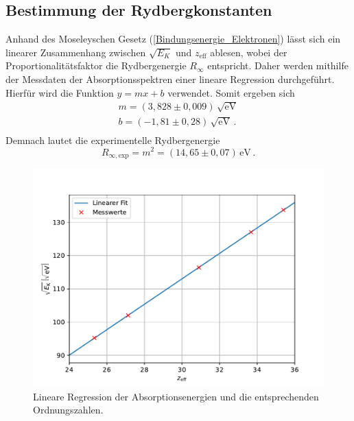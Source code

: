 \subsection{Bestimmung der Rydbergkonstanten}
Anhand des Moseleyschen Gesetz (\ref{Bindungsenergie_Elektronen}) lässt sich ein linearer Zusammenhang zwischen
$\sqrt{E_K}$ und $z_{\text{eff}}$ ablesen, wobei der Proportionalitätsfaktor die Rydbergenergie
$R_{\infty}$ entspricht. Daher werden mithilfe der Messdaten der Absorptionsspektren einer 
lineare Regression durchgeführt. Hierfür wird die Funktion
$y =mx+b$ verwendet. Somit ergeben sich 
\begin{align*}
  m=(3,828\pm0,009)\,\sqrt{\unit{\eV}}\\
  b=(-1,81\pm0,28)\,\sqrt{\unit{\eV}}\,.\\
\end{align*}
Demnach lautet die experimentelle Rydbergenergie 
$$R_{\infty,\text{exp}} = m^2=(14,65\pm0,07)\,\unit{\eV}\,.$$
\begin{figure}[H]
  \centering
  \includegraphics[width=\textwidth]{content/Plots/Rydberg.pdf}
  \caption{Lineare Regression der Absorptionsenergien und die entsprechenden Ordnungszahlen.}
  \label{fig:Rydberg}
\end{figure}
